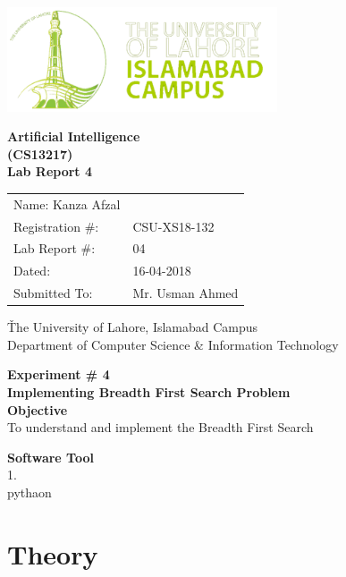 \documentclass[11pt]{article}            %
\begin{document}
\begin{titlepage}
    \centering
  \vfill
    \includegraphics[width=8cm]{uni_logo.png} \\ 
	\vskip2cm
    {\bfseries\Large
	Artificial Intelligence \\ (CS13217)\\
	
	\vskip2cm
	Lab Report 4
	 
	\vskip2cm
	}    

\begin{center}
\begin{tabular}{ l l  } 

Name: Kanza Afzal \\ 
Registration \#: & CSU-XS18-132 \\ 
Lab Report \#: & 04 \\ 
 Dated:&16-04-2018\\ 
Submitted To:& Mr. Usman Ahmed\\ 

\end{tabular}
\end{center}
    \v
    The University of Lahore, Islamabad Campus\\
Department of Computer Science \& Information Technology
\end{titlepage}


    
    {\bfseries\Large
\centering
	Experiment \# 4 \\

Implementing Breadth First  Search Problem\\
	
	}    
 \vskip1cm
 \textbf {Objective}\\  To understand and implement the Breadth First Search
 
 \textbf {Software Tool} \\
1.  \\pythaon

\section{Theory }              
\end{document}
